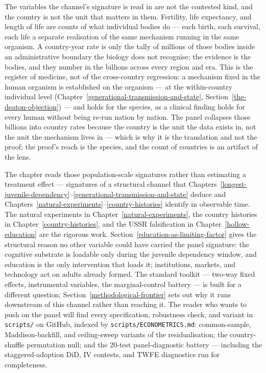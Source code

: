 \documentclass[12pt,letterpaper]{article}
\begin{document}
The variables the channel's signature is read in are not the contested
kind, and the country is not the unit that matters in them. Fertility, life
expectancy, and length of life are counts of what individual bodies do
--- each birth, each survival, each life a separate realisation of the
same mechanism running in the same organism. A country-year rate is only
the tally of millions of those bodies inside an administrative boundary
the biology does not recognise; the evidence is the bodies, and they
number in the billions across every region and era. This is the register
of medicine, not of the cross-country regression: a mechanism fixed in
the human organism is established on the organism --- at the within-country
individual level (Chapter~\ref{generational-transmission-and-state},
Section~\ref{the-deaton-objection}) --- and holds for the
species, as a clinical finding holds for every human without being
re-run nation by nation. The panel collapses those billions into country
rates because the country is the unit the data exists in, not the unit the mechanism lives in --- which is
why it is the translation and not the proof; the proof's reach is the
species, and the count of countries is an artifact of the lens.

The
chapter reads those population-scale signatures rather than estimating a
treatment effect --- signatures of a structural channel that
Chapters~\ref{longest-juvenile-dependency}--\ref{generational-transmission-and-state}
deduce and Chapters~\ref{natural-experiments}--\ref{country-histories}
identify in observable time. The natural experiments in
Chapter~\ref{natural-experiments}, the country histories in
Chapter~\ref{country-histories}, and the USSR falsification in
Chapter~\ref{hollow-education} are the rigorous work.
Section~\ref{education-as-limiting-factor} gives the structural
reason no other variable could have carried the panel signature: the
cognitive substrate is loadable only during the juvenile dependency
window, and education is the only intervention that loads it;
institutions, markets, and technology act on adults already formed.
The standard toolkit --- two-way fixed effects, instrumental
variables, the marginal-control battery --- is built for a different
question; Section~\ref{methodological-frontier} sets out why it runs
downstream of this channel rather than reaching it. The reader who wants to push on the panel will find every
specification, robustness check, and variant in \texttt{scripts/} on
GitHub, indexed by \texttt{scripts/ECONOMETRICS.md}:
common-sample, Maddison-backfill, and ceiling-sweep variants of
the residualisation; the country-shuffle permutation null; and the
20-test panel-diagnostic battery --- including the staggered-adoption
DiD, IV contests, and TWFE diagnostics run for completeness.
\end{document}
